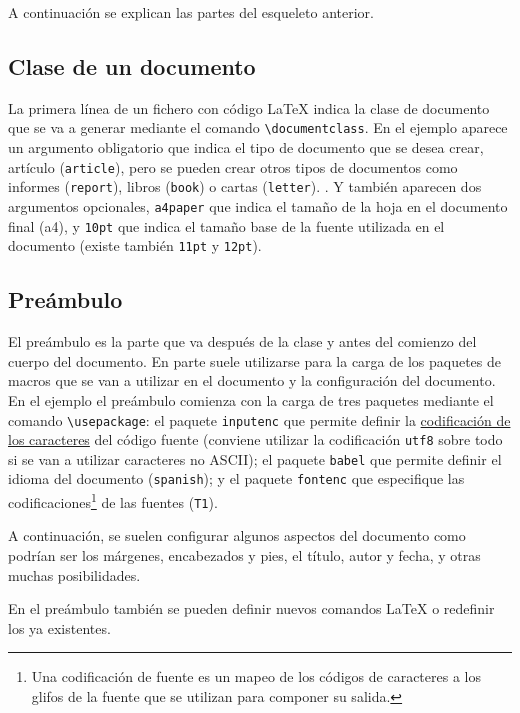 \documentclass[
  spanish,
  a4paper,
]{scrreport}
\theoremstyle{definition}
\theoremstyle{remark}
\begin{document}
A continuación se explican las partes del esqueleto anterior.

\subsection{Clase de un documento}\label{clase-de-un-documento}

La primera línea de un fichero con código LaTeX indica la clase de
documento que se va a generar mediante el comando
\texttt{\textbackslash{}documentclass}. En el ejemplo aparece un
argumento obligatorio que indica el tipo de documento que se desea
crear, artículo (\texttt{article}), pero se pueden crear otros tipos de
documentos como informes (\texttt{report}), libros (\texttt{book}) o
cartas (\texttt{letter}). . Y también aparecen dos argumentos
opcionales, \texttt{a4paper} que indica el tamaño de la hoja en el
documento final (a4), y \texttt{10pt} que indica el tamaño base de la
fuente utilizada en el documento (existe también \texttt{11pt} y
\texttt{12pt}).

\subsection{Preámbulo}\label{preuxe1mbulo}

El preámbulo es la parte que va después de la clase y antes del comienzo
del cuerpo del documento. En parte suele utilizarse para la carga de los
paquetes de macros que se van a utilizar en el documento y la
configuración del documento. En el ejemplo el preámbulo comienza con la
carga de tres paquetes mediante el comando
\texttt{\textbackslash{}usepackage}: el paquete \texttt{inputenc} que
permite definir la
\href{https://es.wikipedia.org/wiki/Codificaci\%C3\%B3n_de_caracteres}{codificación
de los caracteres} del código fuente (conviene utilizar la codificación
\texttt{utf8} sobre todo si se van a utilizar caracteres no ASCII); el
paquete \texttt{babel} que permite definir el idioma del documento
(\texttt{spanish}); y el paquete \texttt{fontenc} que especifique las
codificaciones\footnote{Una codificación de fuente es un mapeo de los
  códigos de caracteres a los glifos de la fuente que se utilizan para
  componer su salida.} de las fuentes (\texttt{T1}).

A continuación, se suelen configurar algunos aspectos del documento como
podrían ser los márgenes, encabezados y pies, el título, autor y fecha,
y otras muchas posibilidades.

En el preámbulo también se pueden definir nuevos comandos LaTeX o
redefinir los ya existentes.
\end{document}
